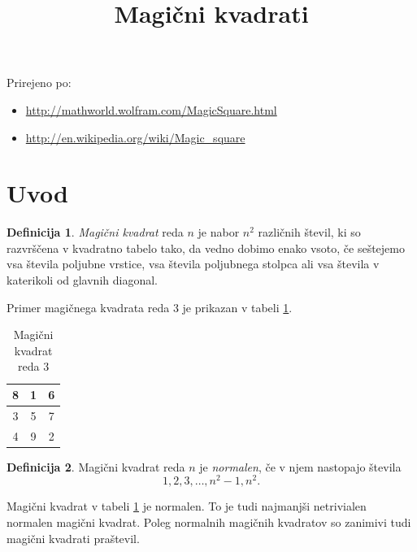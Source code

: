 \documentclass[a4paper,12pt]{article}
\title{Magični kvadrati}
\date{}
\theoremstyle{definition}
\newtheorem{definicija}{Definicija}
\theoremstyle{plain}
\begin{document}
\maketitle

Prirejeno po:

\begin{itemize}
   \item \url{http://mathworld.wolfram.com/MagicSquare.html}
   \item \url{http://en.wikipedia.org/wiki/Magic_square}
\end{itemize}

\tableofcontents

\newpage

\section{Uvod}

\begin{definicija}
   \emph{Magični kvadrat} reda \(n\) je nabor \(n^2\) različnih števil,
   ki so razvrščena v kvadratno tabelo tako, da vedno dobimo enako vsoto,
   če seštejemo vsa števila poljubne vrstice, vsa števila poljubnega
   stolpca ali vsa števila v katerikoli od glavnih diagonal.
\end{definicija}

Primer magičnega kvadrata reda 3 je prikazan v tabeli \ref{table:mag3}.
\begin{table}[h]
   \centering
   \caption{Magični kvadrat reda 3}
   \label{table:mag3}
   \begin{tabular}{|c|c|c|}
      \hline
      8 & 1 & 6 \\ \hline
      3 & 5 & 7 \\ \hline
      4 & 9 & 2 \\ \hline
   \end{tabular}
\end{table}
\begin{definicija}
   Magični kvadrat reda \(n\) je \emph{normalen}, če v njem nastopajo števila
   \begin{equation}
      \label{eq:numbers}
      1, 2, 3, \ldots, n^2-1, n^2.
   \end{equation}
\end{definicija}

Magični kvadrat v tabeli \ref{table:mag3} je normalen.
To je tudi najmanjši netrivialen normalen magični kvadrat.
Poleg normalnih magičnih kvadratov so zanimivi tudi magični kvadrati praštevil. 
\end{document}
